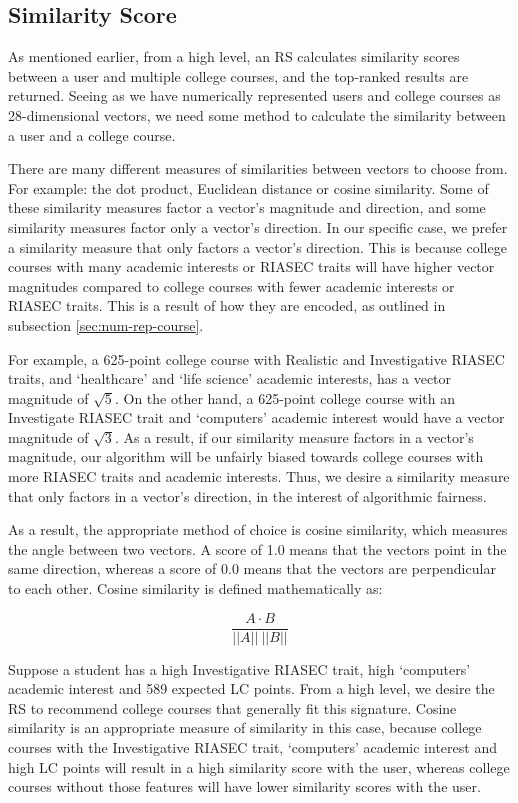 \subsection{Similarity Score}

As mentioned earlier, from a high level, an RS calculates similarity scores between a user and multiple 
college courses, and the top-ranked results are returned.
Seeing as we have numerically represented users and college courses as 28-dimensional vectors, 
we need some method to calculate the similarity between a user and a college course.

There are many different measures of similarities between vectors to choose from.
For example: the dot product, Euclidean distance or cosine similarity.
Some of these similarity measures factor a vector's magnitude and direction,
and some similarity measures factor only a vector's direction.
In our specific case, we prefer a similarity measure that only factors a vector's direction.
This is because college courses with many academic interests or RIASEC traits
will have higher vector magnitudes
compared to college courses with fewer academic interests or RIASEC traits.
This is a result of how they are encoded, as outlined in subsection \ref{sec:num-rep-course}.

For example, a 625-point college course with Realistic and Investigative RIASEC traits, 
and `healthcare' and `life science' academic interests, has a vector magnitude of $\sqrt{5}$.
On the other hand, a 625-point college course with an Investigate RIASEC trait and `computers' academic interest would have a vector magnitude of $\sqrt{3}$.
As a result, if our similarity measure factors in a vector's magnitude, our algorithm will be unfairly
biased towards college courses with more RIASEC traits and academic interests.
Thus, we desire a similarity measure that only factors in a vector's direction, in the interest of algorithmic fairness.

As a result, the appropriate method of choice is cosine similarity, which measures the angle between two vectors.
A score of 1.0 means that the vectors point in the same direction,
whereas a score of 0.0 means that the vectors are perpendicular to each other.
Cosine similarity is defined mathematically as:

\[
\frac{A \cdot B}{||A||\: ||B||}
\]

Suppose a student has a high Investigative RIASEC trait, high `computers' academic interest and 589 expected LC points.
From a high level, we desire the RS to recommend  college courses that generally fit this signature.
Cosine similarity is an appropriate measure of similarity in this case,
because college courses with the Investigative RIASEC trait, `computers' academic interest and high LC points will 
result in a high similarity score with the user,
whereas college courses without those features will have lower similarity scores with the user.

